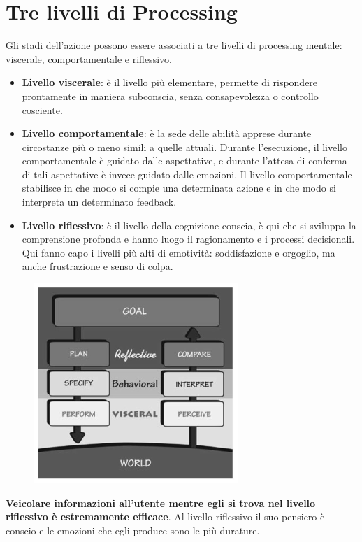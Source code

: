 \section{Tre livelli di Processing}
Gli stadi dell'azione possono essere associati a tre livelli di processing mentale: viscerale, comportamentale e riflessivo.

\begin{itemize}
	\item \textbf{Livello viscerale}: è il livello più elementare, permette di rispondere prontamente in maniera subconscia, senza consapevolezza o controllo cosciente.
	\item \textbf{Livello comportamentale}: è la sede delle abilità apprese durante circostanze più o meno simili a quelle attuali. Durante l'esecuzione, il livello comportamentale è guidato dalle aspettative, e durante l'attesa di conferma di tali aspettative è invece guidato dalle emozioni. Il livello comportamentale stabilisce in che modo si compie una determinata azione e in che modo si interpreta un determinato feedback.
	\item \textbf{Livello riflessivo}: è il livello della cognizione conscia, è qui che si sviluppa la comprensione profonda e hanno luogo il ragionamento e i processi decisionali. Qui fanno capo i livelli più alti di emotività: soddisfazione e orgoglio, ma anche frustrazione e senso di colpa.
\end{itemize}

\begin{figure}[!h]
	\centering
	\includegraphics[scale=1]{"immagini/Livelli di Processing"}
\end{figure}

\pagebreak

\textbf{Veicolare informazioni all'utente mentre egli si trova nel livello riflessivo è estremamente efficace}. Al livello riflessivo il suo pensiero è conscio e le emozioni che egli produce sono le più durature.

